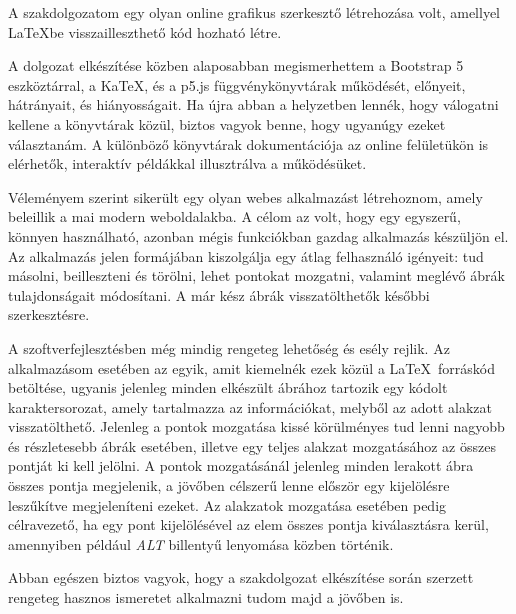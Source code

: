 
A szakdolgozatom egy olyan online grafikus szerkesztő létrehozása volt, amellyel \LaTeX\-be visszailleszthető kód hozható létre. 

A dolgozat elkészítése közben alaposabban megismerhettem a Bootstrap 5\cite{bootstrap} eszköztárral, a KaTeX\cite{katex}, és a p5.js\cite{p5js} függvénykönyvtárak működését, előnyeit, hátrányait, és hiányosságait. Ha újra abban a helyzetben lennék, hogy válogatni kellene a könyvtárak közül, biztos vagyok benne, hogy ugyanúgy ezeket választanám. A különböző könyvtárak dokumentációja az online felületükön is elérhetők, interaktív példákkal illusztrálva a működésüket.

Véleményem szerint sikerült egy olyan webes alkalmazást létrehoznom, amely beleillik a mai modern weboldalakba. A célom az volt, hogy egy egyszerű, könnyen használható, azonban mégis funkciókban gazdag alkalmazás készüljön el. Az alkalmazás jelen formájában kiszolgálja egy átlag felhasználó igényeit: tud másolni, beilleszteni és törölni, lehet pontokat mozgatni, valamint meglévő ábrák tulajdonságait módosítani. A már kész ábrák visszatölthetők későbbi szerkesztésre.

A szoftverfejlesztésben még mindig rengeteg lehetőség és esély rejlik. Az alkalmazásom esetében az egyik, amit kiemelnék ezek közül a \LaTeX\ forráskód betöltése, ugyanis jelenleg minden elkészült ábrához tartozik egy kódolt karaktersorozat, amely tartalmazza az információkat, melyből az adott alakzat visszatölthető. Jelenleg a pontok mozgatása kissé körülményes tud lenni nagyobb és részletesebb ábrák esetében, illetve egy teljes alakzat mozgatásához az összes pontját ki kell jelölni. A pontok mozgatásánál jelenleg minden lerakott ábra összes pontja megjelenik, a jövőben célszerű lenne először egy kijelölésre leszűkítve megjeleníteni ezeket. Az alakzatok mozgatása esetében pedig célravezető, ha egy pont kijelölésével az elem összes pontja kiválasztásra kerül, amennyiben például \textit{ALT} billentyű lenyomása közben történik.

Abban egészen biztos vagyok, hogy a szakdolgozat elkészítése során szerzett rengeteg hasznos ismeretet alkalmazni tudom majd a jövőben is.